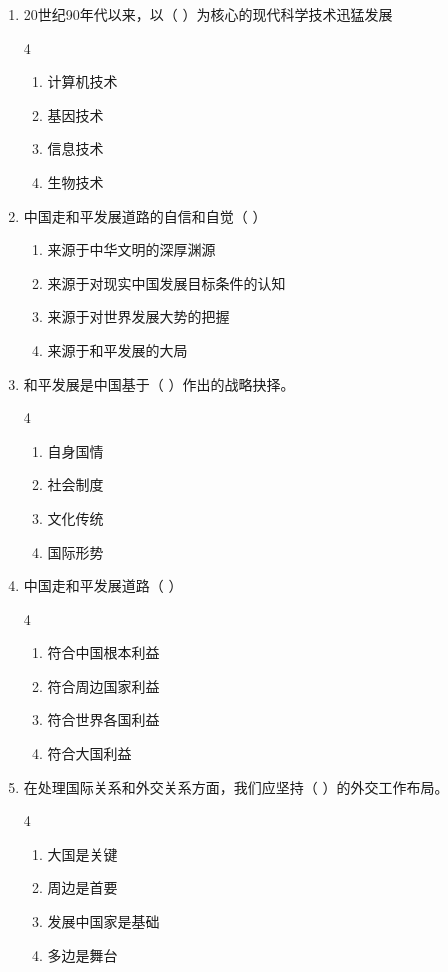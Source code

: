 \documentclass[a4paper,11pt]{ctexart}
\begin{document}
\begin{enumerate}
    \item 20世纪90年代以来，以（ ）为核心的现代科学技术迅猛发展
    \begin{multicols}{4}
    \begin{enumerate}
        \item 计算机技术
        \item 基因技术
        \item 信息技术
        \item 生物技术
    \end{enumerate}
    \end{multicols}

    \item 中国走和平发展道路的自信和自觉（ ）
    \begin{enumerate}
        \item 来源于中华文明的深厚渊源
        \item 来源于对现实中国发展目标条件的认知
        \item 来源于对世界发展大势的把握
        \item 来源于和平发展的大局
    \end{enumerate}

    \item 和平发展是中国基于（ ）作出的战略抉择。
    \begin{multicols}{4}
    \begin{enumerate}
        \item 自身国情
        \item 社会制度
        \item 文化传统
        \item 国际形势
    \end{enumerate}
    \end{multicols}

    \item 中国走和平发展道路（ ）
    \begin{multicols}{4}
    \begin{enumerate}
        \item 符合中国根本利益
        \item 符合周边国家利益
        \item 符合世界各国利益
        \item 符合大国利益
    \end{enumerate}
    \end{multicols}

    \item 在处理国际关系和外交关系方面，我们应坚持（ ）的外交工作布局。
    \begin{multicols}{4}
    \begin{enumerate}
        \item 大国是关键
        \item 周边是首要
        \item 发展中国家是基础
        \item 多边是舞台
    \end{enumerate}
    \end{multicols}


\end{enumerate}
\end{document}
